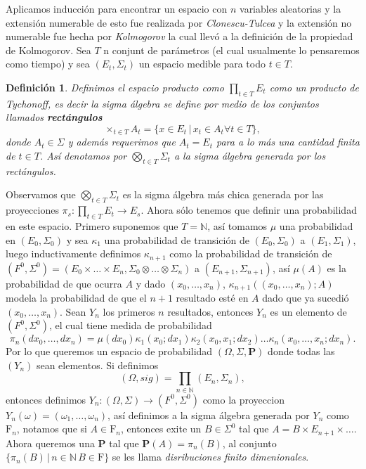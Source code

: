\documentclass[letterpaper]{article}
\newtheorem{def.}{Definici\'on}[section]
\newcommand{\nat}{\ensuremath{ \mathbb N }}
\newcommand{\prob}{\textbf{P}}
\newcommand{\om}{\ensuremath{\Omega}}
\newcommand{\sig}{\ensuremath{\Sigma}}
\begin{document}
Aplicamos inducción para encontrar un espacio con \(n\) variables aleatorias y la extensión numerable de esto fue realizada por \emph{Clonescu-Tulcea} y la extensión no numerable fue hecha por \emph{Kolmogorov} la cual llevó a la definición de la propiedad de Kolmogorov.
Sea \(T\) n conjunt de parámetros (el cual usualmente lo pensaremos como tiempo) y sea \((E_t,\sig_t)\) un espacio medible para todo \(t\in T\).
\begin{def.}
Definimos el espacio producto como \(\prod_{t\in T}E_t\) como un producto de Tychonoff, es decir la sigma álgebra se define por medio de los conjuntos llamados \textbf{rectángulos}
\[
    \times_{t\in T} A_t=\{x\in E_t\,\vert\,x_t\in A_t\forall t\in T\},
\]
\noindent donde \(A_t\in\sig\) y además requerimos que \(A_t=E_t\) para a lo más una cantidad finita de \(t\in T\). Así denotamos por \(\bigotimes_{t\in T}\sig_t\) a la sigma álgebra generada por los rectángulos.
\end{def.}
Observamos que \(\bigotimes_{t\in T}\sig_t\) es la sigma álgebra más chica generada por las proyecciones \(\pi_s:\prod_{t\in T}E_t\rightarrow E_s\). Ahora sólo tenemos que definir una probabilidad en este espacio. Primero suponemos que \(T=\nat\), así tomamos \(\mu\) una probabilidad en \((E_0,\sig_0)\) y sea \(\kappa_1\) una probabilidad de transición de \((E_0,\sig_0)\) a \((E_1,\sig_1)\), luego inductivamente definimos \(\kappa_{n+1}\) como la probabilidad de transición de \((F^{0},\sig^{0})=(E_0\times\dots\times E_{n},\sig_0\otimes\dots\otimes\sig_n)\) a \((E_{n+1},\sig_{n+1})\), así \(\mu(A)\) es la probabilidad de que ocurra \(A\) y dado \((x_0,\dots,x_n)\), \(\kappa_{n+1}((x_0,\dots,x_n);A)\) modela la probabilidad de que el \(n+1\) resultado esté en \(A\) dado que ya sucedió \((x_0,\dots,x_n)\). Sean \(Y_n\) los primeros \(n\) resultados, entonces \(Y_n\) es un elemento de \((F^{0},\sig^{0})\), el cual tiene medida de probabilidad
\[
    \pi_n(dx_0,\dots,dx_n)=\mu(dx_0)\kappa_1(x_0;dx_1)\kappa_2(x_0,x_1;dx_2)\dots\kappa_n(x_0,\dots,x_n;dx_n).
\]
\noindent Por lo que queremos un espacio de probabilidad \((\om,\sig,\prob)\) donde todas las \((Y_n)\) sean elementos. Si definimos
\[
    (\om,sig)=\prod_{n\in\nat}(E_n,\sig_n),
\]
entonces definimos \(Y_n:(\om,\sig)\rightarrow(F^{0},\sig^{0})\) como la proyeccion \(Y_n(\omega)=(\omega_1,\dots,\omega_n)\), así definimos a la sigma álgebra generada por \(Y_n\) como \(\mathrm{F}_n\), notamos que si \(A\in\mathrm{F}_n\), entonces exite un \(B\in\sig^{0}\) tal que \(A=B\times E_{n+1}\times\dots\). Ahora queremos una \textbf{P} tal que \(\prob(A)=\pi_n(B)\), al conjunto \(\{\pi_n(B)\,\vert\,n\in\nat\,B\in\mathrm{F}\}\) se les llama \emph{disribuciones finito dimenionales}.
\end{document}
